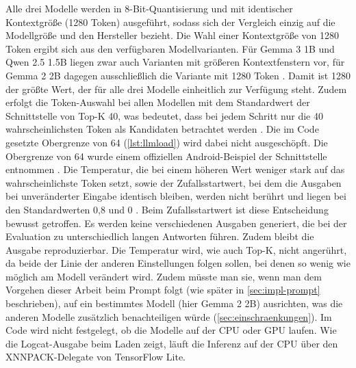 \noindent Alle drei Modelle werden in 8-Bit-Quantisierung und mit identischer Kontextgröße (1280 Token) ausgeführt, sodass sich der Vergleich einzig auf die Modellgröße und den Hersteller bezieht. Die Wahl einer Kontextgröße von 1280 Token ergibt sich aus den verfügbaren Modellvarianten. Für Gemma 3 1B und Qwen 2.5 1.5B liegen zwar auch Varianten mit größeren Kontextfenstern vor, für Gemma 2 2B dagegen ausschließlich die Variante mit 1280 Token \autocite{gemma3_litert,qwen_litert,gemma2_litert}. Damit ist 1280 der größte Wert, der für alle drei Modelle einheitlich zur Verfügung steht. Zudem erfolgt die Token-Auswahl bei allen Modellen mit dem Standardwert der Schnittstelle von Top-K 40, was bedeutet, dass bei jedem Schritt nur die 40 wahrscheinlichsten Token als Kandidaten betrachtet werden \autocite{mediapipe_llm}. Die im Code gesetzte Obergrenze von 64 (\autoref{lst:llmload}) wird dabei nicht ausgeschöpft. Die Obergrenze von 64 wurde einem offiziellen Android-Beispiel der Schnittstelle entnommen \autocite{mediapipe_llm_android}. Die Temperatur, die bei einem höheren Wert weniger stark auf das wahrscheinlichste Token setzt, sowie der Zufallsstartwert, bei dem die Ausgaben bei unveränderter Eingabe identisch bleiben, werden nicht berührt und liegen bei den Standardwerten 0,8 und 0 \autocite{mediapipe_llm}. Beim Zufallsstartwert ist diese Entscheidung bewusst getroffen. Es werden keine verschiedenen Ausgaben generiert, die bei der Evaluation zu unterschiedlich langen Antworten führen. Zudem bleibt die Ausgabe reproduzierbar. Die Temperatur wird, wie auch Top-K, nicht angerührt, da beide der Linie der anderen Einstellungen folgen sollen, bei denen so wenig wie möglich am Modell verändert wird. Zudem müsste man sie, wenn man dem Vorgehen dieser Arbeit beim Prompt folgt (wie später in \autoref{sec:impl-prompt} beschrieben), auf ein bestimmtes Modell (hier Gemma 2 2B) ausrichten, was die anderen Modelle zusätzlich benachteiligen würde (\autoref{sec:einschraenkungen}). Im Code wird nicht festgelegt, ob die Modelle auf der CPU oder GPU laufen. Wie die Logcat-Ausgabe beim Laden zeigt, läuft die Inferenz auf der CPU über den XNNPACK-Delegate von TensorFlow Lite.


